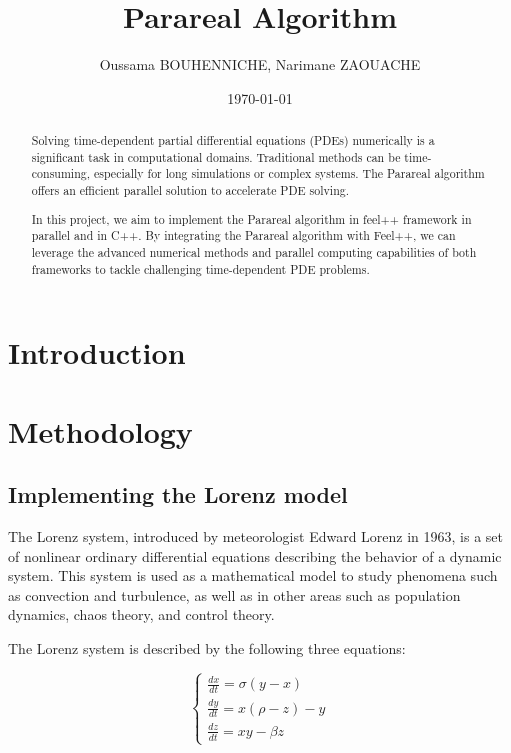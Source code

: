 \documentclass{article}
\title{Parareal Algorithm}
\author{Oussama  BOUHENNICHE, 
Narimane ZAOUACHE}
\date{\today}
\begin{document}
\maketitle

\begin{abstract}
    Solving time-de­pendent partial differe­ntial equations (PDEs) numerically is 
    a significant task in computational domains. Traditional methods can be­ 
    time-consuming, especially for long simulations or comple­x systems. 
    The Parareal algorithm \cite{lions2001resolution} offe­rs an efficient parallel solution to acce­lerate PDE solving.

    In this project, we aim to implement the Parareal algorithm in feel++ framework in parallel and in C++. 
    By integrating the Parareal algorithm with Feel++, 
    we can leverage the advanced numerical methods and parallel computing 
     capabilities of both frameworks to tackle challenging time-dependent PDE problems.
    \end{abstract}

\section{Introduction}

 
 \section{Methodology}
 \subsection{Implementing the Lorenz model}


 The Lorenz system\cite{lorenz1963deterministic}, introduced by meteorologist Edward Lorenz in 1963, 
 is a set of nonlinear ordinary differential equations describing the behavior of a dynamic system. 
 This system is used as a mathematical model to study phenomena such as convection and turbulence, 
 as well as in other areas such as population dynamics, chaos theory, and control theory.



 The Lorenz system is described by the following three equations:

 \[
\left\{
\begin{array}{ccc}
\frac{dx}{dt} = \sigma(y - x) \\
\frac{dy}{dt} = x(\rho - z) - y \\
\frac{dz}{dt} = xy - \beta z
\end{array}
\right.
\]
\end{document}
